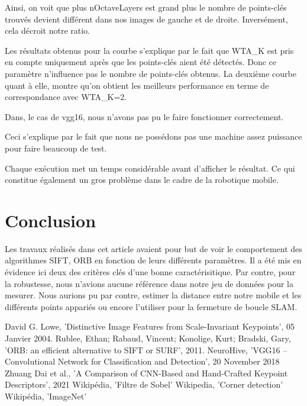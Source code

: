 \documentclass[conference]{IEEEtran}
\begin{document}
Ainsi, on voit que plus nOctaveLayers est grand plus le nombre de points-clés trouvés devient différent dans nos images de gauche et de droite. Inversément, cela décroit notre ratio. 

Les résultats obtenus pour la courbe s'explique par le fait que WTA\_K est pris en compte uniquement après que les points-clés aient été détectés. Donc ce paramètre n'influence pas le nombre de points-clés obtenus. 
La deuxième courbe quant à elle, montre qu'on obtient les meilleurs performance en terme de correspondance avec WTA\_K=2.

Dans, le cas de vgg16, nous n'avons pas pu le faire fonctionner correctement. 

Ceci s'explique par le fait que nous ne possédons pas une machine assez puissance pour faire beaucoup de test. 

Chaque exécution met un temps considérable avant d'afficher le résultat. Ce qui constitue également un gros problème dans le cadre de la robotique mobile.

\section*{Conclusion}

Les travaux réalisés dans cet article avaient pour but de voir le comportement des algorithmes SIFT, ORB en fonction de leurs différents paramètres. Il a été mis en évidence ici deux des critères clés d'une bonne caractérisitique. Par contre, pour la robustesse, nous n'avions aucune référence dans notre jeu de données pour la mesurer. Nous aurions pu par contre, estimer la distance entre notre mobile et les différents points appariés ou encore l'utiliser pour la fermeture de boucle SLAM.

\begin{thebibliography}{00}
 David G. Lowe, 'Distinctive Image Features from Scale-Invariant Keypoints', 05 Janvier 2004.
  Rublee, Ethan; Rabaud, Vincent; Konolige, Kurt; Bradski, Gary, 'ORB: an efficient alternative to SIFT or SURF', 2011.
 NeuroHive, 'VGG16 – Convolutional Network for Classification and Detection', 20 November 2018
 Zhuang Dai et al., 'A Comparison of CNN-Based and Hand-Crafted Keypoint Descriptors', 2021
 Wikipédia, 'Filtre de Sobel'
 Wikipedia, 'Corner detection'
 Wikipédia, 'ImageNet'
\end{thebibliography}
\vspace{12pt}
\color{red}
\end{document}
